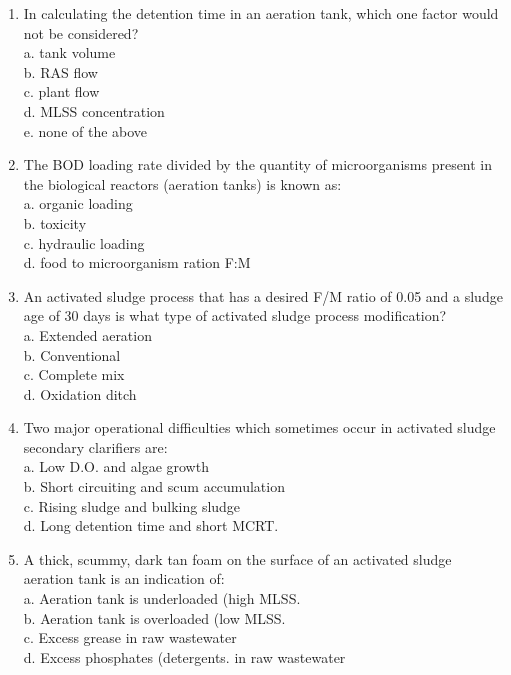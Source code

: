 \begin{tcolorbox}[breakable, enhanced,
colframe=blue!25,
colback=blue!10,
coltitle=blue!20!black,  
title= Chapter Assessment]
\begin{enumerate}
\item In calculating the detention time in an aeration tank, which one factor would not be considered? \\
a. tank volume \\
b. RAS flow \\
c. plant flow \\
d. MLSS concentration \\
e. none of the above \\

\item The BOD loading rate divided by the quantity of microorganisms present in the biological reactors (aeration tanks) is known as: \\
a. organic loading \\
b. toxicity \\
c. hydraulic loading \\
d. food to microorganism ration F:M \\

\item An activated sludge process that has a desired F/M ratio of 0.05 and a sludge age of 30 days is what type of activated sludge process modification? \\
a. Extended aeration \\
b. Conventional \\
c. Complete mix \\
d. Oxidation ditch \\

\item Two major operational difficulties which sometimes occur in activated sludge secondary clarifiers are: \\
a. Low D.O. and algae growth \\
b. Short circuiting and scum accumulation \\
c. Rising sludge and bulking sludge \\
d. Long detention time and short MCRT. \\

\item A thick, scummy, dark tan foam on the surface of an activated sludge aeration tank is an indication of: \\
a. Aeration tank is underloaded (high MLSS. \\
b. Aeration tank is overloaded (low MLSS. \\
c. Excess grease in raw wastewater \\
d. Excess phosphates (detergents. in raw wastewater \\


\end{enumerate}
\end{tcolorbox}
